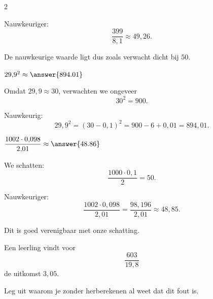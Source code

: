 \documentclass{ximera}
\begin{document}
\begin{oefening}{\oefU\ESS}
\begin{multicols}{2}
\begin{question}
\begin{oplossing}
                Nauwkeuriger:
                \[
                \dfrac{399}{8{,}1}
                \approx49{,}26.
                \]
                
                De nauwkeurige waarde ligt dus zoals verwacht dicht bij $50$.
                \end{oplossing}
                \end{question}
                
                
                \begin{question}
                $29{,}9^2\approx\answer{894.01}$
                
                \begin{oplossing}
                Omdat $29{,}9\approx30$, verwachten we ongeveer
                \[
                30^2=900.
                \]
                
                Nauwkeurig:
                \[
                29{,}9^2
                =(30-0{,}1)^2
                =900-6+0{,}01
                =894{,}01.
                \]
                \end{oplossing}
                \end{question}
                
                
                \begin{question}
                $\dfrac{1002\cdot0{,}098}{2{,}01}\approx\answer{48.86}$
                
                \begin{oplossing}
                We schatten:
                \[
                \dfrac{1000\cdot0{,}1}{2}
                =50.
                \]
                
                Nauwkeuriger:
                \[
                \dfrac{1002\cdot0{,}098}{2{,}01}
                =\dfrac{98{,}196}{2{,}01}
                \approx48{,}85.
                \]
                
                Dit is goed verenigbaar met onze schatting.
                \end{oplossing}
                \end{question}
                
                
                \begin{question}
                Een leerling vindt voor
                \[
                \dfrac{603}{19{,}8}
                \]
                de uitkomst $3{,}05$.
                
                Leg uit waarom je zonder herberekenen al weet dat dit fout is.
                

\end{question}
\end{multicols}
\end{oefening}
\end{document}
